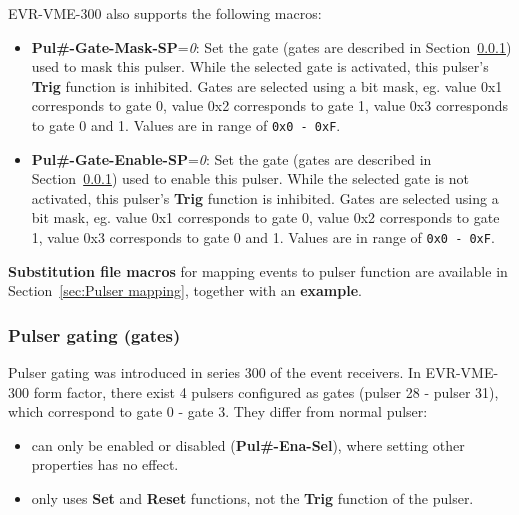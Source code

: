 \documentclass[12pt,a4paper]{article}
\begin{document}
EVR-VME-300 also supports the following macros:
\begin{itemize}
  \item
    \textbf{Pul\#-Gate-Mask-SP}=\emph{0}: Set the gate (gates are described in Section~\ref{sec:Pulser gate}) used to mask this pulser. While the selected gate is activated, this pulser's \textbf{Trig} function is inhibited. Gates are selected using a bit mask, eg. value 0x1 corresponds to gate 0, value 0x2 corresponds to gate 1, value 0x3 corresponds to gate 0 and 1. Values are in range of \texttt{0x0 - 0xF}.
  \item
     \textbf{Pul\#-Gate-Enable-SP}=\emph{0}: Set the gate (gates are described in Section~\ref{sec:Pulser gate}) used to enable this pulser. While the selected gate is not activated, this pulser's \textbf{Trig} function is inhibited. Gates are selected using a bit mask, eg. value 0x1 corresponds to gate 0, value 0x2 corresponds to gate 1, value 0x3 corresponds to gate 0 and 1. Values are in range of \texttt{0x0 - 0xF}.
  \end{itemize}

\textbf{Substitution file macros} for mapping events to pulser function are available in Section~\ref{sec:Pulser mapping}, together with an \textbf{example}.

\subsubsection{Pulser gating (gates)}\label{sec:Pulser gate}
Pulser gating was introduced in series 300 of the event receivers. In EVR-VME-300 form factor, there exist 4 pulsers configured as gates (pulser 28 - pulser 31), which correspond to gate 0 - gate 3. They differ from normal pulser:
\begin{itemize}
	\item can only be enabled or disabled (\textbf{Pul\#-Ena-Sel}), where setting other properties has no effect.
	\item only uses \textbf{Set} and \textbf{Reset} functions, not the \textbf{Trig} function of the pulser.
\end{itemize}
\end{document}
